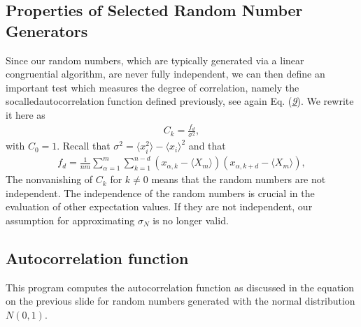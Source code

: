 \documentclass[letterpaper,10pt,english]{sphinxmanual}
\begin{document}
\subsection{Properties of Selected Random Number Generators}
\label{\detokenize{chapter2:id15}}
Since our random numbers, which are typically generated via a linear congruential algorithm,
are never fully independent, we can then define
an important test which measures the degree of correlation, namely the  so\sphinxhyphen{}calledauto\sphinxhyphen{}correlation function defined previously, see again Eq. ({\hyperref[\detokenize{chapter2:eq:autocorrelformal}]{\emph{9}}}).
We rewrite it here as
\begin{equation*}
\begin{split}
C_k=\frac{f_d}
             {\sigma^2},
\end{split}
\end{equation*}
with \(C_0=1\). Recall that
\(\sigma^2=\langle x_i^2\rangle-\langle x_i\rangle^2\) and that
\begin{equation*}
\begin{split}
f_d = \frac{1}{nm}\sum_{\alpha=1}^m\sum_{k=1}^{n-d}(x_{\alpha,k}-\langle X_m \rangle)(x_{\alpha,k+d}-\langle X_m \rangle),
\end{split}
\end{equation*}
The non\sphinxhyphen{}vanishing of \(C_k\) for \(k\ne 0\) means that the random
numbers are not independent. The independence of the random numbers is crucial
in the evaluation of other expectation values. If they are not independent, our
assumption for approximating \(\sigma_N\) is no longer valid.


\subsection{Autocorrelation function}
\label{\detokenize{chapter2:autocorrelation-function}}
This program computes the autocorrelation function as discussed in the equation on the previous slide for random numbers generated with the normal distribution \(N(0,1)\).
\end{document}
